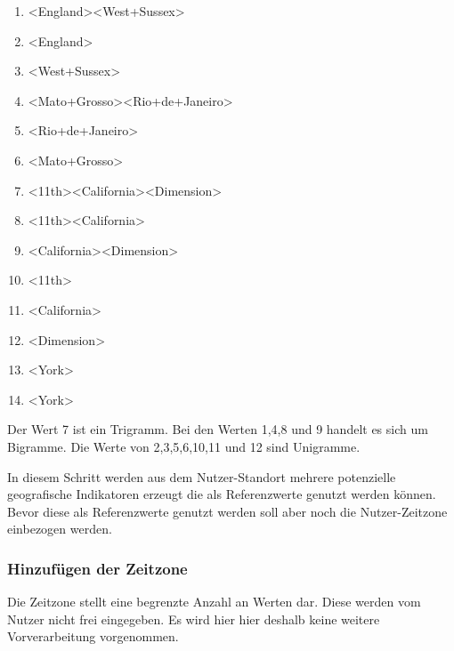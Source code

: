 				\begin{multicols}{2}
					\begin{enumerate}
						\item \textless England\textgreater   \textless West+Sussex\textgreater  
						\item \textless England\textgreater  
						\item \textless West+Sussex\textgreater  
						\item \textless Mato+Grosso\textgreater   \textless Rio+de+Janeiro\textgreater  
						\item \textless Rio+de+Janeiro\textgreater  
						\item \textless Mato+Grosso\textgreater  
						\item \textless 11th\textgreater   \textless California\textgreater   \textless Dimension\textgreater   
						\item \textless 11th\textgreater   \textless California\textgreater  
						\item \textless California\textgreater   \textless Dimension\textgreater   
						\item \textless 11th\textgreater  
						\item \textless California\textgreater  
						\item \textless Dimension\textgreater   
						\item \textless York\textgreater  
						\item \textless York\textgreater  
					\end{enumerate}
				\end{multicols}
				Der Wert 7 ist ein Trigramm.
				Bei den Werten 1,4,8 und 9 handelt es sich um Bigramme. 
				Die Werte von 2,3,5,6,10,11 und 12 sind Unigramme.				

				In diesem Schritt werden aus dem Nutzer-Standort mehrere potenzielle geografische Indikatoren erzeugt die als Referenzwerte genutzt werden können.
				Bevor diese als Referenzwerte genutzt werden soll aber noch die Nutzer-Zeitzone einbezogen werden.

			\subsubsection{Hinzufügen der Zeitzone}

				Die Zeitzone stellt eine begrenzte Anzahl an Werten dar.
				Diese werden vom Nutzer nicht frei eingegeben. 
				Es wird hier hier deshalb keine weitere Vorverarbeitung vorgenommen.

